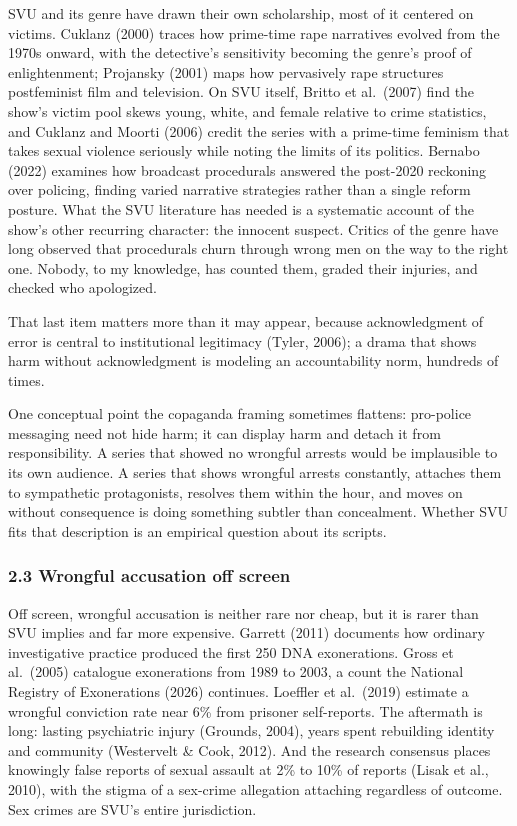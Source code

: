 \documentclass[
]{article}
\begin{document}
SVU and its genre have drawn their own scholarship, most of it centered
on victims. Cuklanz (2000) traces how prime-time rape narratives evolved
from the 1970s onward, with the detective's sensitivity becoming the
genre's proof of enlightenment; Projansky (2001) maps how pervasively
rape structures postfeminist film and television. On SVU itself, Britto
et al.~(2007) find the show's victim pool skews young, white, and female
relative to crime statistics, and Cuklanz and Moorti (2006) credit the
series with a prime-time feminism that takes sexual violence seriously
while noting the limits of its politics. Bernabo (2022) examines how
broadcast procedurals answered the post-2020 reckoning over policing,
finding varied narrative strategies rather than a single reform posture.
What the SVU literature has needed is a systematic account of the show's
other recurring character: the innocent suspect. Critics of the genre
have long observed that procedurals churn through wrong men on the way
to the right one. Nobody, to my knowledge, has counted them, graded
their injuries, and checked who apologized.

That last item matters more than it may appear, because acknowledgment
of error is central to institutional legitimacy (Tyler, 2006); a drama
that shows harm without acknowledgment is modeling an accountability
norm, hundreds of times.

One conceptual point the copaganda framing sometimes flattens:
pro-police messaging need not hide harm; it can display harm and detach
it from responsibility. A series that showed no wrongful arrests would
be implausible to its own audience. A series that shows wrongful arrests
constantly, attaches them to sympathetic protagonists, resolves them
within the hour, and moves on without consequence is doing something
subtler than concealment. Whether SVU fits that description is an
empirical question about its scripts.

\subsubsection{2.3 Wrongful accusation off
screen}\label{wrongful-accusation-off-screen}

Off screen, wrongful accusation is neither rare nor cheap, but it is
rarer than SVU implies and far more expensive. Garrett (2011) documents
how ordinary investigative practice produced the first 250 DNA
exonerations. Gross et al.~(2005) catalogue exonerations from 1989 to
2003, a count the National Registry of Exonerations (2026) continues.
Loeffler et al.~(2019) estimate a wrongful conviction rate near 6\% from
prisoner self-reports. The aftermath is long: lasting psychiatric injury
(Grounds, 2004), years spent rebuilding identity and community
(Westervelt \& Cook, 2012). And the research consensus places knowingly
false reports of sexual assault at 2\% to 10\% of reports (Lisak et al.,
2010), with the stigma of a sex-crime allegation attaching regardless of
outcome. Sex crimes are SVU's entire jurisdiction.
\end{document}
